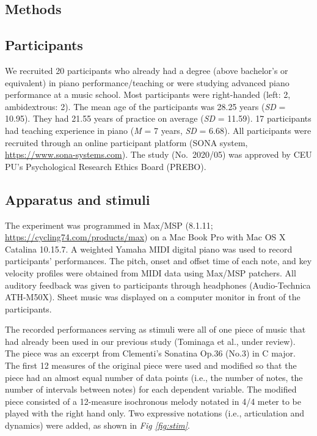 \documentclass[
  man,floatsintext]{apa6}
\begin{document}
\hypertarget{methods}{%
\subsection{Methods}\label{methods}}

\hypertarget{participants}{%
\subsection{Participants}\label{participants}}

We recruited 20 participants who already had a degree (above bachelor's or equivalent) in piano performance/teaching or were studying advanced piano performance at a music school. Most participants were right-handed (left: 2, ambidextrous: 2). The mean age of the participants was 28.25 years (\emph{SD} = 10.95). They had 21.55 years of practice on average (\emph{SD} = 11.59). 17 participants had teaching experience in piano (\emph{M} = 7 years, \emph{SD} = 6.68). All participants were recruited through an online participant platform (SONA system, \url{https://www.sona-systems.com}). The study (No.~2020/05) was approved by CEU PU's Psychological Research Ethics Board (PREBO).

\hypertarget{apparatus-and-stimuli}{%
\subsection{Apparatus and stimuli}\label{apparatus-and-stimuli}}

The experiment was programmed in Max/MSP (8.1.11; \url{https://cycling74.com/products/max}) on a Mac Book Pro with Mac OS X Catalina 10.15.7. A weighted Yamaha MIDI digital piano was used to record participants' performances. The pitch, onset and offset time of each note, and key velocity profiles were obtained from MIDI data using Max/MSP patchers. All auditory feedback was given to participants through headphones (Audio-Technica ATH-M50X). Sheet music was displayed on a computer monitor in front of the participants.

The recorded performances serving as stimuli were all of one piece of music that had already been used in our previous study (Tominaga et al., under review). The piece was an excerpt from Clementi's Sonatina Op.36 (No.3) in C major. The first 12 measures of the original piece were used and modified so that the piece had an almost equal number of data points (i.e., the number of notes, the number of intervals between notes) for each dependent variable. The modified piece consisted of a 12-measure isochronous melody notated in 4/4 meter to be played with the right hand only. Two expressive notations (i.e., articulation and dynamics) were added, as shown in \emph{Fig \ref{fig:stim}}.
\end{document}
